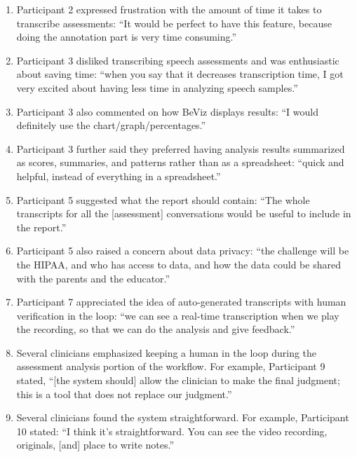 \documentclass[12pt]{article}
\begin{document}
{\renewcommand{\theenumi}{A\arabic{enumi}}\renewcommand{\labelenumi}{\textbf{\theenumi.}}
\begin{enumerate}
  \item \label{AppA_P2TimeConsuming} Participant 2 expressed frustration with the amount of time it takes to transcribe assessments: “It would be perfect to have this feature, because doing the annotation part is very time consuming.”
  \item \label{AppA_P3TranscriptionTime} Participant 3 disliked transcribing speech assessments and was enthusiastic about saving time: “when you say that it decreases transcription time, I got very excited about having less time in analyzing speech samples.”
  \item \label{AppA_P3Charts} Participant 3 also commented on how BeViz displays results: “I would definitely use the chart/graph/percentages.”
  \item \label{AppA_P3Summaries} Participant 3 further said they preferred having analysis results summarized as scores, summaries, and patterns rather than as a spreadsheet: “quick and helpful, instead of everything in a spreadsheet.”
  \item \label{AppA_P5ReportTranscripts} Participant 5 suggested what the report should contain: “The whole transcripts for all the [assessment] conversations would be useful to include in the report.”
  \item \label{AppA_P5HIPAA} Participant 5 also raised a concern about data privacy: “the challenge will be the HIPAA, and who has access to data, and how the data could be shared with the parents and the educator.”
  \item \label{AppA_P7RealTimeTranscript} Participant 7 appreciated the idea of auto-generated transcripts with human verification in the loop: “we can see a real-time transcription when we play the recording, so that we can do the analysis and give feedback.”
  \item \label{AppA_P9FinalJudgment} Several clinicians emphasized keeping a human in the loop during the assessment analysis portion of the workflow. For example, Participant 9 stated, “[the system should] allow the clinician to make the final judgment; this is a tool that does not replace our judgment.”
  \item \label{AppA_P10Straightforward} Several clinicians found the system straightforward. For example, Participant 10 stated: “I think it’s straightforward. You can see the video recording, originals, [and] place to write notes.”

\end{enumerate}}
\end{document}
